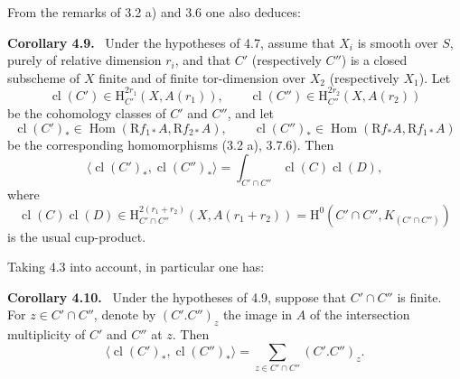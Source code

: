 \documentclass[11pt]{article}
\newenvironment{statement}[1]{\par\medskip\noindent\textbf{#1.}\ }{\par\medskip}
\renewcommand{\H}{\mathrm{H}}
\DeclareMathOperator{\Hom}{Hom}
\newcommand{\R}{\mathrm{R}}
\providecommand{\cl}{\operatorname{cl}}
\providecommand{\Hom}{\operatorname{Hom}}
\providecommand{\R}{\mathrm R}
\providecommand{\cl}{\operatorname{cl}}
\providecommand{\Hom}{\operatorname{Hom}}
\providecommand{\cl}{\operatorname{cl}}
\begin{document}
From the remarks of 3.2 a) and 3.6 one also deduces:

\begin{statement}{Corollary 4.9}
Under the hypotheses of 4.7, assume that $X_i$ is smooth over $S$, purely of relative dimension $r_i$, and that $C'$ (respectively $C''$) is a closed subscheme of $X$ finite and of finite tor-dimension over $X_2$ (respectively $X_1$). Let
\[
\cl(C')\in \H_{C'}^{2r_1}(X,A(r_1)),\qquad
\cl(C'')\in \H_{C''}^{2r_2}(X,A(r_2))
\]
be the cohomology classes of $C'$ and $C''$, and let
\[
\cl(C')_*\in\Hom(\R f_{1*}A,\R f_{2*}A),\qquad
\cl(C'')_*\in\Hom(\R f_{*}A,\R f_{1*}A)
\]
be the corresponding homomorphisms (3.2 a), 3.7.6). Then
\[
\langle \cl(C')_*,\cl(C'')_*\rangle
=
\int_{C'\cap C''}\cl(C)\cl(D),
\]
where
\[
\cl(C)\cl(D)\in
\H_{C'\cap C''}^{2(r_1+r_2)}(X,A(r_1+r_2))
=
\H^0(C'\cap C'',K_{(C'\cap C'')})
\]
is the usual cup-product.
\end{statement}

Taking 4.3 into account, in particular one has:

\begin{statement}{Corollary 4.10}
Under the hypotheses of 4.9, suppose that $C'\cap C''$ is finite. For $z\in C'\cap C''$, denote by $(C'.C'')_z$ the image in $A$ of the intersection multiplicity of $C'$ and $C''$ at $z$. Then
\[
\langle \cl(C')_*,\cl(C'')_*\rangle
=
\sum_{z\in C'\cap C''}(C'.C'')_z.
\]
\end{statement}
\end{document}
